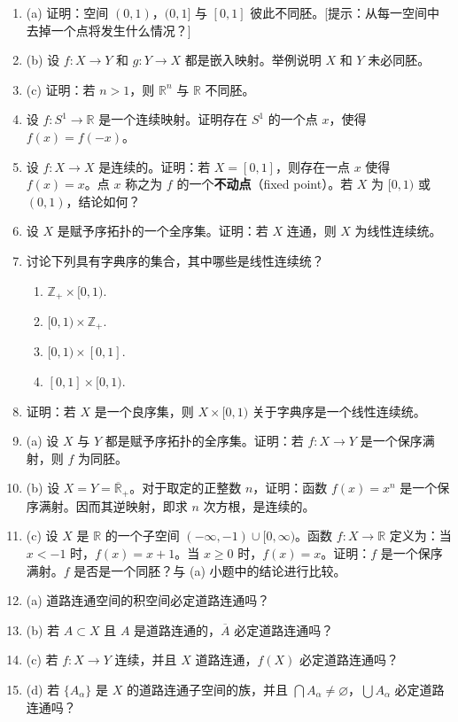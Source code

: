 \begin{enumerate}
\item (a) 证明：空间 $(0,1)$，$(0,1]$ 与 $[0,1]$ 彼此不同胚。[提示：从每一空间中去掉一个点将发生什么情况？]
\item (b) 设 $f\colon X\to Y$ 和 $g\colon Y\to X$ 都是嵌入映射。举例说明 $X$ 和 $Y$ 未必同胚。
\item (c) 证明：若 $n>1$，则 $\mathbb{R}^{n}$ 与 $\mathbb{R}$ 不同胚。
\item 设 $f\colon S^{1}\to\mathbb{R}$ 是一个连续映射。证明存在 $S^{1}$ 的一个点 $x$，使得 $f(x)=f(-x)$。
\item 设 $f\colon X\to X$ 是连续的。证明：若 $X=[0,1]$，则存在一点 $x$ 使得 $f(x)=x$。点 $x$ 称之为 $f$ 的一个\textbf{不动点}（fixed point）。若 $X$ 为 $[0,1)$ 或 $(0,1)$，结论如何？
\item 设 $X$ 是赋予序拓扑的一个全序集。证明：若 $X$ 连通，则 $X$ 为线性连续统。
\item 讨论下列具有字典序的集合，其中哪些是线性连续统？
\begin{enumerate}
\item $\mathbb{Z}_{+}\times[0,1)$.
\item $[0,1)\times\mathbb{Z}_{+}$.
\item $[0,1)\times[0,1]$.
\item $[0,1]\times[0,1)$.
\end{enumerate}
\item 证明：若 $X$ 是一个良序集，则 $X\times[0,1)$ 关于字典序是一个线性连续统。
\item (a) 设 $X$ 与 $Y$ 都是赋予序拓扑的全序集。证明：若 $f\colon X\to Y$ 是一个保序满射，则 $f$ 为同胚。
\item (b) 设 $X=Y=\overline{\mathbb{R}}_{+}$。对于取定的正整数 $n$，证明：函数 $f(x)=x^{n}$ 是一个保序满射。因而其逆映射，即求 $n$ 次方根，是连续的。
\item (c) 设 $X$ 是 $\mathbb{R}$ 的一个子空间 $(-\infty,-1)\cup[0,\infty)$。函数 $f\colon X\to\mathbb{R}$ 定义为：当 $x<-1$ 时，$f(x)=x+1$。当 $x\geqslant 0$ 时，$f(x)=x$。证明：$f$ 是一个保序满射。$f$ 是否是一个同胚？与 (a) 小题中的结论进行比较。
\item (a) 道路连通空间的积空间必定道路连通吗？
\item (b) 若 $A\subset X$ 且 $A$ 是道路连通的，$\overline{A}$ 必定道路连通吗？
\item (c) 若 $f\colon X\to Y$ 连续，并且 $X$ 道路连通，$f(X)$ 必定道路连通吗？
\item (d) 若 $\{A_{\alpha}\}$ 是 $X$ 的道路连通子空间的族，并且 $\bigcap A_{\alpha}\neq\varnothing$，$\bigcup A_{\alpha}$ 必定道路连通吗？

\end{enumerate}
